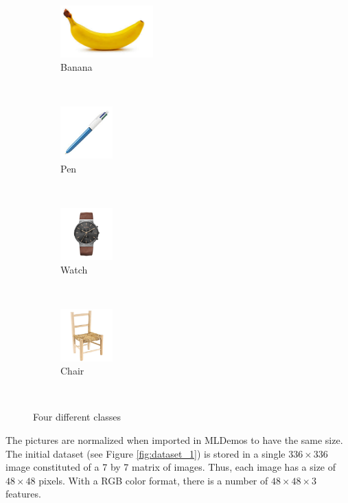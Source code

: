 \documentclass[a4paper,10pt]{article}
\begin{document}
\begin{figure}[H]
\centering
    \begin{subfigure}[t]{0.2\textwidth}
        \centering
        \includegraphics[height=2cm]{pictures/banana} 
        \caption{Banana}
        \label{fig:banana}
    \end{subfigure}%
    ~
    \begin{subfigure}[t]{0.2\textwidth}
        \centering
        \includegraphics[height=2cm]{pictures/stylo4} 
        \caption{Pen}
        \label{fig:pen}
    \end{subfigure}
    ~
    \begin{subfigure}[t]{0.2\textwidth}
        \centering
        \includegraphics[height=2cm]{pictures/watch2} 
        \caption{Watch}
        \label{fig:watch}
    \end{subfigure} 
    ~ 
    \begin{subfigure}[t]{0.2\textwidth}
        \centering
        \includegraphics[height=2cm]{pictures/chair30} 
        \caption{Chair}
        \label{fig:chair}
    \end{subfigure} 
    ~
\caption{Four different classes}
\label{fig:class}
\end{figure}


The pictures are normalized when imported in MLDemos to have the same size. The initial dataset (see Figure \ref{fig:dataset_1}) is stored in a single $336 \times 336 $ image constituted of a 7 by 7 matrix of images. Thus, each image has a size of $48 \times 48$ pixels. With a RGB color format, there is a number of $48\times48\times3$ features.
\end{document}
